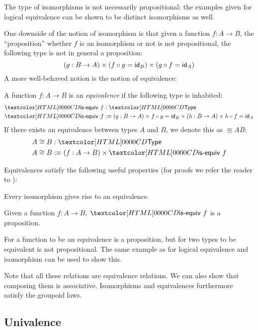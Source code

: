 The type of isomorphisms is not necessarily propositional: the
examples given for logical equivalence can be shown to be distinct
isomorphisms as well.

One downside of the notion of isomorphism is that given a function
$f : A \to B$, the ``proposition'' whether $f$ is an isomorphism or
not is not propositional, \ie the following type is not in general a
proposition:
$$
(g : B \to A) \times (f \circ g = \id_B) \times (g \circ f = \id_A)
$$
A more well-behaved notion is the notion of equivalence:
\begin{definition}[Equivalence]
  A function $f : A \to B$ is an \emph{equivalence} if the following
  type is inhabited:
  \begin{align*}
    &\isequiv\ f : \Type \\
    &\isequiv\ f \ddefeq (g : B \to A) \times f \circ g = \id_B \times (h : B \to A) \times h \circ f = \id_A
  \end{align*}
  If there exists an equivalence between types $A$ and $B$, we denote
  this as $\Equiv{A}{B}$:
  \begin{align*}
    &\Equiv{A}{B} : \Type \\
    &\Equiv{A}{B} \ddefeq (f : A \to B) \times \isequiv\ f
  \end{align*}
\end{definition}

Equivalences satisfy the following useful properties (for proofs we
refer the reader to \cite{UFP2013}):

\begin{proposition}
  Every isomorphism gives rise to an equivalence.
\end{proposition}

\begin{proposition}
  Given a function $f : A \to B$, $\isequiv\ f$ is a proposition.
\end{proposition}

For a function to be an equivalence is a proposition, but for two
types to be equivalent is not propositional. The same example as for
logical equivalence and isomorphism can be used to show this.

Note that all these relations are equivalence relations. We can also
show that composing them is associative. Isomorphisms and
equivalences furthermore satisfy the groupoid laws.

\subsection{Univalence}

